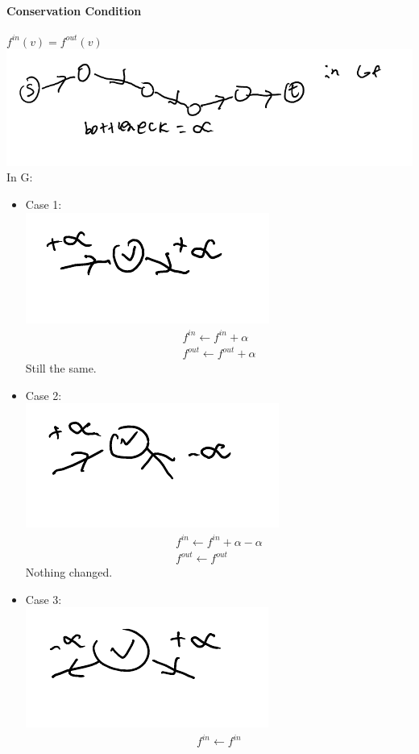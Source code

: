 \documentclass[12 pt]{article}
\begin{document}
        \paragraph{Conservation Condition} $f^{in}(v)=f^{out}(v)$
        \\ \includegraphics[width=.7\textwidth]{i14.pdf}
        \\ In G:
        \begin{itemize}
        \item Case 1:
        \\\includegraphics[width=.3\textwidth]{i15.pdf}
          \begin{align*}
            f^{in} \gets f^{in} + \alpha
            \\ f^{out} \gets f^{out} + \alpha
          \end{align*}
          Still the same.
        \item Case 2:
        \\\includegraphics[width=.3\textwidth]{i16.pdf}
          \begin{align*}
            f^{in} \gets f^{in} + \alpha - \alpha
            \\ f^{out} \gets f^{out}
          \end{align*}
          Nothing changed.
        \item Case 3:
        \\\includegraphics[width=.3\textwidth]{i17.pdf}
          \begin{align*}
            f^{in} \gets f^{in}

\end{align*}
\end{itemize}
\end{document}
